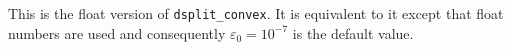 This is the float version of \verb+dsplit_convex+. It is equivalent
to it except that float numbers are used and consequently
$\varepsilon_0 = 10^{-7}$ is the default value.

